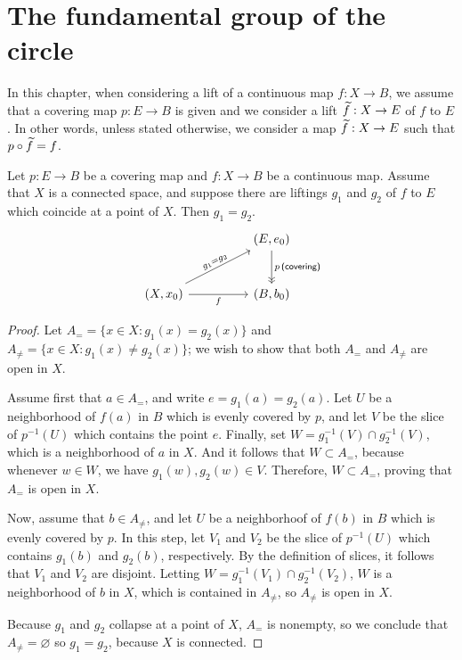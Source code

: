\section{The fundamental group of the circle}

\begin{rmk}
    In this chapter, when considering a lift of a continuous map $f: X\rightarrow B$, we assume that a covering map $p: E\rightarrow B$ is given and we consider a lift $\widetilde{f}: X\rightarrow E$ of $f$ to $E$.
    In other words, unless stated otherwise, we consider a map $\widetilde{f}: X\rightarrow E$ such that $p\circ\widetilde{f}=f$.
\end{rmk}

\begin{thm}
    Let $p: E\rightarrow B$ be a covering map and $f: X\rightarrow B$ be a continuous map.
    Assume that $X$ is a connected space, and suppose there are liftings $g_1$ and $g_2$ of $f$ to $E$ which coincide at a point of $X$.
    Then $g_1=g_2$.
    \begin{equation*}
    \begin{tikzcd}[row sep=large, column sep=huge]
        &
        (E, e_0)
        \arrow[d, "p\,\textsf{(covering)}", ->>]
        \\
        (X, x_0)
        \arrow[ur, "g_1=g_2"{sloped}]
        \arrow[r, "f"']
        &
        (B, b_0)
    \end{tikzcd}
    \end{equation*}
\end{thm}
\begin{proof}
    Let $A_{=}=\{x\in X: g_1(x)=g_2(x)\}$ and $A_{\neq}=\{x\in X: g_1(x)\neq g_2(x)\}$; we wish to show that both $A_{=}$ and $A_{\neq}$ are open in $X$.

    Assume first that $a\in A_{=}$, and write $e=g_1(a)=g_2(a)$.
    Let $U$ be a neighborhood of $f(a)$ in $B$ which is evenly covered by $p$, and let $V$ be the slice of $p^{-1}(U)$ which contains the point $e$.
    Finally, set $W=g_1^{-1}(V)\cap g_2^{-1}(V)$, which is a neighborhood of $a$ in $X$.
    And it follows that $W\subset A_{=}$, because whenever $w\in W$, we have $g_1(w), g_2(w)\in V$.
    Therefore, $W\subset A_{=}$, proving that $A_{=}$ is open in $X$.

    Now, assume that $b\in A_{\neq}$, and let $U$ be a neighborhoof of $f(b)$ in $B$ which is evenly covered by $p$.
    In this step, let $V_1$ and $V_2$ be the slice of $p^{-1}(U)$ which contains $g_1(b)$ and $g_2(b)$, respectively.
    By the definition of slices, it follows that $V_1$ and $V_2$ are disjoint.
    Letting $W=g_1^{-1}(V_1)\cap g_2^{-1}(V_2)$, $W$ is a neighborhood of $b$ in $X$, which is contained in $A_{\neq}$, so $A_{\neq}$ is open in $X$.

    Because $g_1$ and $g_2$ collapse at a point of $X$, $A_{=}$ is nonempty, so we conclude that $A_{\neq}=\varnothing$ so $g_1=g_2$, because $X$ is connected.
\end{proof}
